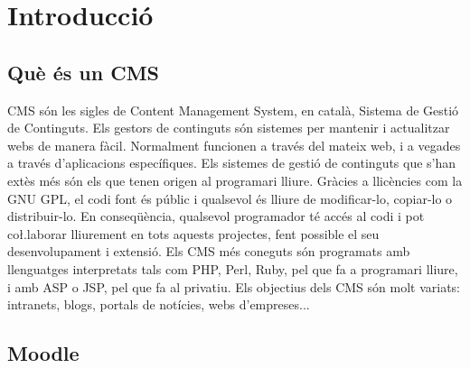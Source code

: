\documentclass[a4paper]{report}  %
\begin{document}
\tableofcontents



\chapter{Introducció}

\section{Què és un CMS}
CMS són les sigles de Content Management System, en català, Sistema de Gestió de Continguts.
Els gestors de continguts són sistemes per mantenir i actualitzar webs de manera fàcil. Normalment funcionen a través del mateix web, i a vegades a través d'aplicacions específiques. Els sistemes de gestió de continguts que s'han extès més són els que tenen origen al programari lliure.
Gràcies a llicències com la GNU GPL, el codi font és públic i qualsevol és lliure de modificar-lo, copiar-lo o distribuir-lo. En conseqüència, qualsevol programador té accés al codi i pot co\l.laborar lliurement en tots aquests projectes, fent possible el seu desenvolupament i extensió.
Els CMS més coneguts són programats amb llenguatges interpretats tals com PHP, Perl, Ruby, pel que fa a programari lliure, i amb ASP o JSP, pel que fa al privatiu.
Els objectius dels CMS són molt variats: intranets, blogs, portals de notícies, webs d'empreses...

\section{Moodle}
\end{document}
